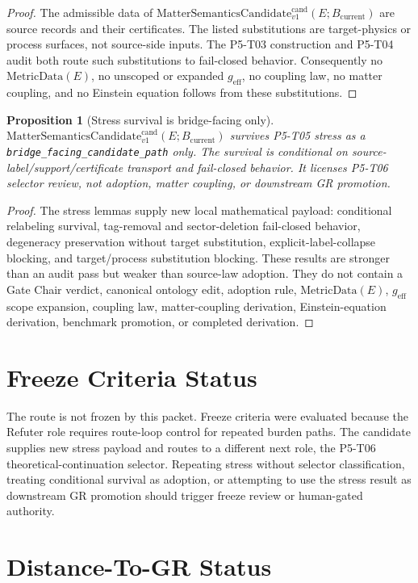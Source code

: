 \documentclass[11pt]{article}
\newcommand{\MetricData}{\mathrm{MetricData}}
\newcommand{\geff}{g_{\mathrm{eff}}}
\newcommand{\Bcur}{B_{\mathrm{current}}}
\newcommand{\MSCand}{\mathrm{MatterSemanticsCandidate}^{\mathrm{cand}}_{v1}}
\newtheorem{proposition}{Proposition}
\begin{document}
\begin{proof}
The admissible data of \(\MSCand(E;\Bcur)\) are source records and their
certificates. The listed substitutions are target-physics or process surfaces,
not source-side inputs. The P5-T03 construction and P5-T04 audit both route
such substitutions to fail-closed behavior. Consequently no \(\MetricData(E)\),
no unscoped or expanded \(\geff\), no coupling law, no matter coupling, and no
Einstein equation follows from these substitutions.
\end{proof}

\begin{proposition}[Stress survival is bridge-facing only]
\(\MSCand(E;\Bcur)\) survives P5-T05 stress as a
\texttt{bridge\_facing\_candidate\_path} only. The survival is conditional on
source-label/support/certificate transport and fail-closed behavior. It
licenses P5-T06 selector review, not adoption, matter coupling, or downstream
GR promotion.
\end{proposition}

\begin{proof}
The stress lemmas supply new local mathematical payload: conditional
relabeling survival, tag-removal and sector-deletion fail-closed behavior,
degeneracy preservation without target substitution, explicit-label-collapse
blocking, and target/process substitution blocking. These results are stronger
than an audit pass but weaker than source-law adoption. They do not contain a
Gate Chair verdict, canonical ontology edit, adoption rule, \(\MetricData(E)\),
\(\geff\) scope expansion, coupling law, matter-coupling derivation,
Einstein-equation derivation, benchmark promotion, or completed derivation.
\end{proof}

\section{Freeze Criteria Status}

The route is not frozen by this packet. Freeze criteria were evaluated because
the Refuter role requires route-loop control for repeated burden paths. The
candidate supplies new stress payload and routes to a different next role, the
P5-T06 theoretical-continuation selector. Repeating stress without selector
classification, treating conditional survival as adoption, or attempting to
use the stress result as downstream GR promotion should trigger freeze review
or human-gated authority.

\section{Distance-To-GR Status}
\end{document}
